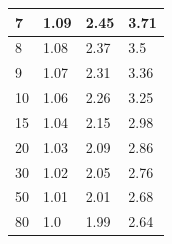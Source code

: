 \documentclass[TGAI_Laborbericht.tex]{subfiles}
\begin{document}
\begin{table}[H]
\begin{tabular}{|l|l|l|l|}
7                                                              & 1.09                                                                & 2.45                                                             & 3.71                                                             \\ \hline
8                                                              & 1.08                                                                & 2.37                                                             & 3.5                                                              \\ \hline
9                                                              & 1.07                                                                & 2.31                                                             & 3.36                                                             \\ \hline
10                                                             & 1.06                                                                & 2.26                                                             & 3.25                                                             \\ \hline
15                                                             & 1.04                                                                & 2.15                                                             & 2.98                                                             \\ \hline
20                                                             & 1.03                                                                & 2.09                                                             & 2.86                                                             \\ \hline
30                                                             & 1.02                                                                & 2.05                                                             & 2.76                                                             \\ \hline
50                                                             & 1.01                                                                & 2.01                                                             & 2.68                                                             \\ \hline
80                                                             & 1.0                                                                 & 1.99                                                             & 2.64                                                             \\ \hline

\end{tabular}
\end{table}
\end{document}

